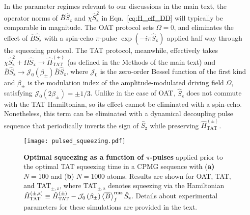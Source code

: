 \documentclass{nature}
\renewcommand{\t}{\text} %
\newcommand{\p}[1]{\left(#1\right)} %
\newcommand{\bk}{\Braket}
\newcommand{\J}{\mathcal{J}}
\newcommand{\z}{\text{z}}
\newcommand{\x}{\text{x}}
\begin{document}
In the parameter regimes relevant to our discussions in the main text, the operator norms of $\overline{B}\hat S_\z$ and $\chi \hat S_\z^2$ in Eqn.~\eqref{eq:H_eff_DD} will typically be comparable in magnitude.
The OAT protocol sets $\Omega=0$, and eliminates the effect of $\overline{B}\hat S_\z$ with a spin-echo $\pi$-pulse $\exp\p{-i\pi\hat S_\x}$ applied half way through the squeezing protocol.
The TAT protocol, meanwhile, effectively takes $\chi\hat S_\z^2+\Omega \hat S_\x\to\hat H_{\t{TAT}}^{(\pm)}$ (as defined in the Methods of the main text) and $\overline{B}\hat S_\z\to\J_0\p{\beta_\pm}\overline{B}\hat S_\z$, where $\J_0$ is the zero-order Bessel function of the first kind and $\beta_\pm$ is the modulation index of the amplitude-modulated driving field $\Omega$, satisfying $\J_0\p{2\beta_\pm}=\pm1/3$.
Unlike in the case of OAT, $\hat S_\z$ does not commute with the TAT Hamiltonian, so its effect cannot be eliminated with a spin-echo.
Nonetheless, this term can be eliminated with a dynamical decoupling pulse sequence that periodically inverts the sign of $\hat S_\z$ while preserving $\hat H_{\t{TAT}}^{(\pm)}$.

\begin{spacing}{1}
\begin{figure}
\centering
\texttt{[image: pulsed\_squeezing.pdf]}
\caption{{\bf Optimal squeezing as a function of $\pi$-pulses} applied prior to the optimal TAT squeezing time in a CPMG sequence with ({\bf a)} $N=100$ and ({\bf b}) $N=1000$ atoms.
Results are shown for OAT, TAT, and TAT$_{\pm,\z}$, where TAT$_{\pm,\z}$ denotes squeezing via the Hamiltonian $\hat H_{\t{TAT}}^{(\pm,\z)}\equiv \hat H_{\t{TAT}}^{(\pm)}-\J_0\p{\beta_\pm}\bk{\overline B}^{\t{rms}}_f \hat S_\z$.
Details about experimental parameters for these simulations are provided in the text.
}
\label{fig:pulsed_squeezing}
\end{figure}
\end{spacing}
\end{document}

